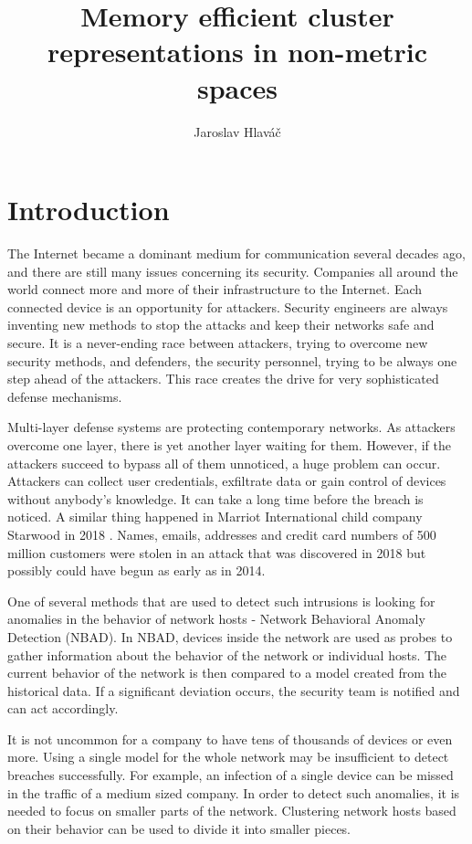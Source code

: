 \documentclass[thesis=B,english]{FITthesis}[2012/10/20]
\title{ Memory efficient cluster representations in non-metric spaces}
\author{Jaroslav Hlaváč} %
\begin{document}

\chapter{Introduction}

The Internet became a dominant medium for communication several decades ago, and there are still many issues concerning its security.
Companies all around the world connect more and more of their infrastructure to the Internet.
Each connected device is an opportunity for attackers.
Security engineers are always inventing new methods to stop the attacks and keep their networks safe and secure.
It is a never-ending race between attackers, trying to overcome new security methods, and defenders, the security personnel, trying to be always one step ahead of the attackers.
This race creates the drive for very sophisticated defense mechanisms.

Multi-layer defense systems are protecting contemporary networks.
As attackers overcome one layer, there is yet another layer waiting for them.
However, if the attackers succeed to bypass all of them unnoticed, a huge problem can occur.
Attackers can collect user credentials,  exfiltrate data or gain control of devices without anybody's knowledge.
It can take a long time before the breach is noticed.
A similar thing happened in Marriot International child company Starwood in 2018 \cite{hron2018breaches}.
Names, emails, addresses and credit card numbers of 500 million customers were stolen in an attack that was discovered in 2018 but possibly could have begun as early as in 2014.

One of several methods that are used to detect such intrusions is looking for anomalies in the behavior of network hosts - Network Behavioral Anomaly Detection (NBAD).
In NBAD, devices inside the network are used as probes to gather information about the behavior of the network or individual hosts.
The current behavior of the network is then compared to a model created from the historical data.
If a significant deviation occurs, the security team is notified and can act accordingly.

It is not uncommon for a company to have tens of thousands of devices or even more.
Using a single model for the whole network may be insufficient to detect breaches successfully.
For example, an infection of a single device can be missed in the traffic of a medium sized company.
In order to detect such anomalies, it is needed to focus on smaller parts of the network.
Clustering network hosts based on their behavior can be used to divide it into smaller pieces.
\end{document}
